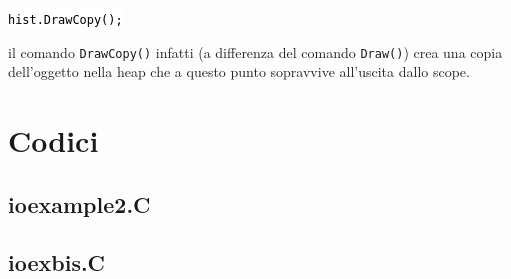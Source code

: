 \documentclass{article}
\newcommand{\ttt}{\texttt}
\newcommand{\tcpp}[1]{\hspace{10pt}\colorbox{background}{\textcolor{black}{\texttt{#1}}}}
\begin{document}
\tcpp{hist.DrawCopy();}

il comando \ttt{DrawCopy()} infatti (a differenza del comando \ttt{Draw()}) crea una copia dell'oggetto nella heap che a questo punto sopravvive all'uscita dallo scope.



\newpage
\section{Codici}

\subsection{ioexample2.C}


\newpage

\subsection{ioexbis.C}

\end{document}
